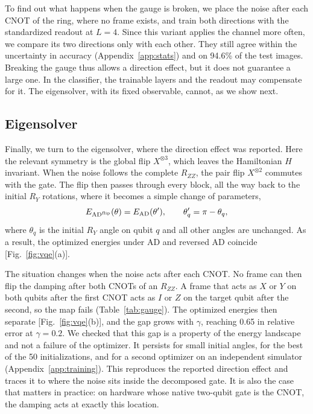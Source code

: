 \documentclass[
 aps,pra,
 twocolumn,
 superscriptaddress,
 longbibliography,
 nofootinbib
]{revtex4-2}
\newcommand{\AD}{\mathrm{AD}}
\begin{document}
To find out what happens when the gauge is broken, we place the noise after
each CNOT of the ring, where no frame exists, and train both directions with
the standardized readout at $L=4$. Since this variant applies the channel more
often, we compare its two directions only with each other. They still agree
within the uncertainty in accuracy (Appendix~\ref{app:stats}) and on 94.6\% of
the test images. Breaking the gauge thus allows a direction effect, but it does
not guarantee a large one. In the classifier, the trainable layers and the
readout may compensate for it. The eigensolver, with its fixed observable,
cannot, as we show next.

\subsection{Eigensolver}
\label{sec:gauge_vqe}

Finally, we turn to the eigensolver, where the direction effect was
reported. Here the relevant symmetry is the global flip $X^{\otimes3}$,
which leaves the Hamiltonian $H$ invariant. When the noise follows the complete
$R_{ZZ}$, the pair flip $X^{\otimes2}$ commutes with the gate. The flip then
passes through every block, all the way back to the initial $R_Y$ rotations,
where it becomes a simple change of parameters,
\begin{equation}
E_{\AD^{\rm flip}}(\theta)=E_{\AD}(\theta'),\qquad \theta'_q=\pi-\theta_q ,
\label{eq:vqe_gauge}
\end{equation}
where $\theta_q$ is the initial $R_Y$ angle on qubit $q$ and all other angles
are unchanged. As a result, the optimized energies under AD and reversed AD
coincide [Fig.~\ref{fig:vqe}(a)].

The situation changes when the
noise acts after each CNOT. No frame can
then flip the damping after both CNOTs of an $R_{ZZ}$. A frame that acts as $X$
or $Y$ on both qubits after the first CNOT acts as $I$ or $Z$ on the target
qubit after the second, so the map fails (Table~\ref{tab:gauge}). The
optimized energies then separate [Fig.~\ref{fig:vqe}(b)], and the gap grows
with $\gamma$, reaching 0.65 in relative error at $\gamma=0.2$.
We checked that this gap is a property of the
energy landscape and not a failure of the optimizer. It persists for small
initial angles, for the best of the 50 initializations, and for a second
optimizer on an independent simulator (Appendix~\ref{app:training}).
This
reproduces the reported direction effect and traces
it to where the noise sits inside the decomposed gate. It is also the case
that matters in practice: on hardware whose native two-qubit gate is the CNOT,
the damping acts at exactly this location.
\end{document}
